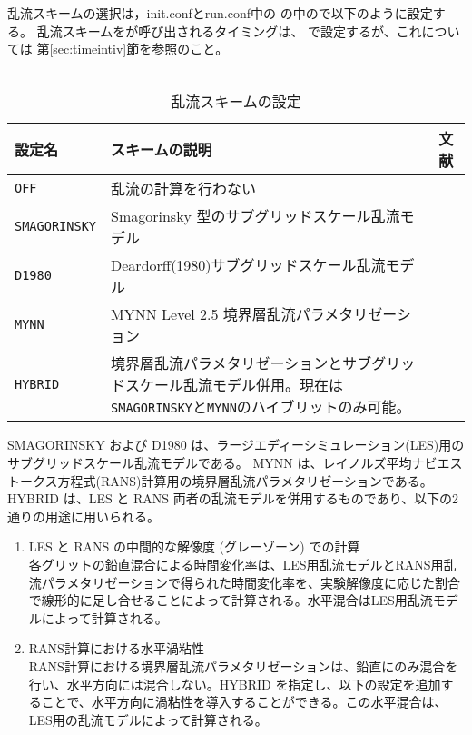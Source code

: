 乱流スキームの選択は，init.confとrun.conf中の
の中ので以下のように設定する。
乱流スキームをが呼び出されるタイミングは、
で設定するが、これについては
第\ref{sec:timeintiv}節を参照のこと。\\

\\

\begin{table}[h]
\begin{center}
  \caption{乱流スキームの設定}
  \label{tab:nml_atm_tb}
  \begin{tabularx}{150mm}{lXX} \hline
    \rowcolor[gray]{0.9}  設定名 & スキームの説明 & 文献\\ \hline
      \verb|OFF|          & 乱流の計算を行わない &  \\
      \verb|SMAGORINSKY|  & Smagorinsky 型のサブグリッドスケール乱流モデル & \citet{smagorinsky_1963,lilly_1962,Brown_etal_1994,Scotti_1993} \\
      \verb|D1980|        & Deardorff(1980)サブグリッドスケール乱流モデル & \citet{Deardorff_1980} \\
      \verb|MYNN|         & MYNN Level 2.5 境界層乱流パラメタリゼーション & \citet{my_1982,nakanishi_2004} \\
      \verb|HYBRID|       & 境界層乱流パラメタリゼーションとサブグリッドスケール乱流モデル併用。現在は\verb|SMAGORINSKY|と\verb|MYNN|のハイブリットのみ可能。 & \\
    \hline
  \end{tabularx}
\end{center}
\end{table}

SMAGORINSKY および D1980 は、ラージエディーシミュレーション(LES)用のサブグリッドスケール乱流モデルである。
MYNN は、レイノルズ平均ナビエストークス方程式(RANS)計算用の境界層乱流パラメタリゼーションである。
HYBRID は、LES と RANS 両者の乱流モデルを併用するものであり、以下の2通りの用途に用いられる。
\begin{enumerate}
\item LES と RANS の中間的な解像度 (グレーゾーン) での計算\\
  各グリットの鉛直混合による時間変化率は、LES用乱流モデルとRANS用乱流パラメタリゼーションで得られた時間変化率を、実験解像度に応じた割合で線形的に足し合せることによって計算される。水平混合はLES用乱流モデルによって計算される。
\item RANS計算における水平渦粘性\\
  RANS計算における境界層乱流パラメタリゼーションは、鉛直にのみ混合を行い、水平方向には混合しない。HYBRID を指定し、以下の設定を追加することで、水平方向に渦粘性を導入することができる。この水平混合は、LES用の乱流モデルによって計算される。
\end{enumerate}


